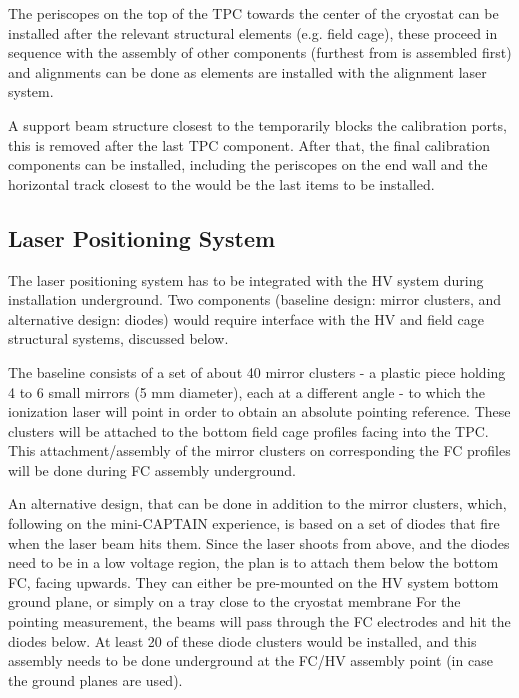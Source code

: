 The periscopes on the top of the TPC towards the center of the cryostat can be installed after the relevant structural elements (e.g. field cage), these proceed in sequence with the assembly of other components (furthest from  is assembled first) and alignments can be done as elements are installed with the alignment laser system. 


A support beam structure closest to the  temporarily blocks the calibration ports, this is removed after the last TPC component. After that, the final calibration components can be installed, including the periscopes on the  end wall and the horizontal track closest to the  would be the last items to be installed. 

\subsection{Laser Positioning System}
The laser positioning system has to be integrated with the HV system during installation underground. Two components (baseline design: mirror clusters, and alternative design: diodes) would require interface with the HV and field cage structural systems, discussed below.

The baseline consists of a set of about 40 mirror clusters - a plastic piece holding 4 to 6 small mirrors (5 mm diameter), each at a different angle - to which the ionization laser will point in order to obtain an absolute pointing reference. These clusters will be attached to the bottom field cage profiles facing into the TPC. 
This attachment/assembly of the mirror clusters on corresponding the FC profiles will be done during FC assembly underground.

An alternative design, that can be done in addition to the mirror clusters, which, following on the mini-CAPTAIN experience, is based on a set of diodes that fire when the laser beam hits them. Since the laser shoots from above, and the diodes need to be in a low voltage region, the plan is to attach them below the bottom FC, facing upwards. They can either be pre-mounted on the HV system bottom ground plane, or simply on a tray close to the cryostat membrane
For the pointing measurement, the beams will pass through the FC electrodes and hit the diodes below. At least 20 of these diode clusters would be installed, and this assembly needs to be done underground at the FC/HV assembly point (in case the ground planes are used).

